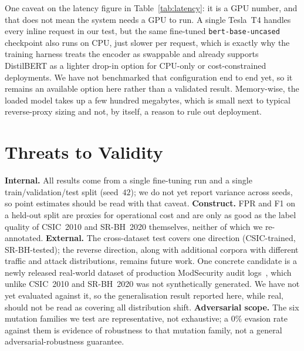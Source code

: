 \documentclass[conference]{IEEEtran}
\begin{document}
One caveat on the latency figure in Table~\ref{tab:latency}: it is a GPU
number, and that does not mean the system needs a GPU to run. A single
Tesla~T4 handles every inline request in our test, but the same fine-tuned
\texttt{bert-base-uncased} checkpoint also runs on CPU, just slower per
request, which is exactly why the training harness treats the encoder as
swappable and already supports DistilBERT as a lighter drop-in option for
CPU-only or cost-constrained deployments. We have not benchmarked that
configuration end to end yet, so it remains an available option here rather
than a validated result. Memory-wise, the loaded model takes up a few
hundred megabytes, which is small next to typical reverse-proxy sizing and
not, by itself, a reason to rule out deployment.

\section{Threats to Validity}
\textbf{Internal.} All results come from a single fine-tuning run and a
single train/validation/test split (seed~$42$); we do not yet report
variance across seeds, so point estimates should be read with that caveat.
\textbf{Construct.} FPR and F1 on a held-out split are proxies for
operational cost and are only as good as the label quality of CSIC~2010 and
SR-BH~2020 themselves, neither of which we re-annotated. \textbf{External.}
The cross-dataset test covers one direction (CSIC-trained, SR-BH-tested);
the reverse direction, along with additional corpora with different
traffic and attack distributions, remains future work. One concrete
candidate is a newly released real-world dataset of production
ModSecurity audit logs~\cite{modsec30day2025}, which unlike CSIC~2010 and
SR-BH~2020 was not synthetically generated. We have not yet evaluated
against it, so the generalisation result reported here, while real,
should not be read as covering all distribution shift.
\textbf{Adversarial scope.} The six mutation families we test are
representative, not exhaustive; a $0\%$ evasion rate against them is
evidence of robustness to that mutation family, not a general
adversarial-robustness guarantee.
\end{document}
